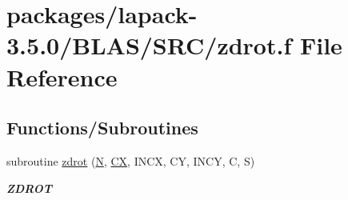 \hypertarget{lapack-3_85_80_2BLAS_2SRC_2zdrot_8f}{}\section{packages/lapack-\/3.5.0/\+B\+L\+A\+S/\+S\+R\+C/zdrot.f File Reference}
\label{lapack-3_85_80_2BLAS_2SRC_2zdrot_8f}
\subsection*{Functions/\+Subroutines}
\begin{DoxyCompactItemize}
\item 
subroutine \hyperlink{group__complex16__blas__level1_ga28dfedb950adf3316eb1f5af85c2cdb3}{zdrot} (\hyperlink{polmisc_8c_a0240ac851181b84ac374872dc5434ee4}{N}, \hyperlink{scsum1_8c_a5a76da95c549c41790389a76e12fdcb5}{C\+X}, I\+N\+C\+X, C\+Y, I\+N\+C\+Y, C, S)
\begin{DoxyCompactList}\small\item\em {\bfseries Z\+D\+R\+O\+T} \end{DoxyCompactList}\end{DoxyCompactItemize}
